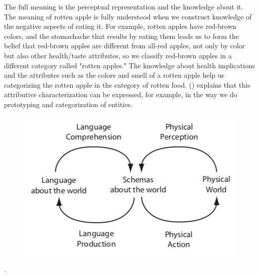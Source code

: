 \documentclass[11pt, a4paper]{article}
\begin{document}
The full meaning is the perceptual representation and the knowledge about it. The meaning of rotten apple is fully understood when we construct knowledge of the negative aspects of eating it. For example, rotten apples have red-brown colors, and the stomachache that results by eating them leads us to form the belief that red-brown apples are different from all-red apples, not only by color but also other health/taste attributes, so we classify red-brown apples in a different category called "rotten apples." The knowledge about health implications and the attributes such as the colors and smell of a rotten apple help us categorizing the rotten apple in the category of rotten food. (\cite{lakoff2008metaphors}) explains that this attributive characterization can be expressed, for example, in the way we do prototyping and categorization of entities.



\begin{figure}[H]
\centering
\includegraphics[scale=0.5]{images/symbolsyststem.png}
\caption{\cite{roy2005semiotic}}
\label{fig:roy}
\end{figure}.
\end{document}

